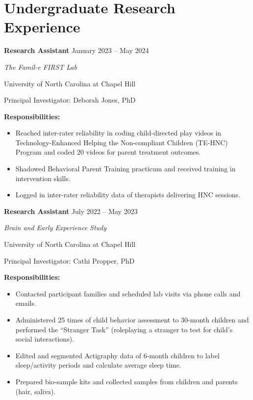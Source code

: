 \documentclass[12pt]{article}
\begin{document}
\section{Undergraduate Research Experience}
\textbf{Research Assistant}
\hfill January 2023 – May 2024

\noindent \textit{The Famil-e FIRST Lab}

\noindent University of North Carolina at Chapel Hill

\noindent Principal Investigator: Deborah Jones, PhD

\vspace{0.5em} \hspace{1em}
\textbf{Responsibilities:}
\begin{itemize} [left=3em]
    \itemsep=-0.35em
    \item Reached inter-rater reliability in coding child-directed play videos in Technology-Enhanced Helping the Non-compliant Children (TE-HNC) Program and coded 20 videos for parent treatment outcomes.
    \item Shadowed Behavioral Parent Training practicum and received training in intervention skills.
    \item Logged in inter-rater reliability data of therapists delivering HNC sessions.
\end{itemize}

\vspace{1em}
\noindent \textbf{Research Assistant}
\hfill July 2022 – May 2023

\noindent \textit{Brain and Early Experience Study}

\noindent University of North Carolina at Chapel Hill

\noindent Principal Investigator: Cathi Propper, PhD

\vspace{1em} \hspace{1em}
\textbf{Responsibilities:}
\begin{itemize} [left=3em]
    \itemsep=-0.35em
    \item Contacted participant families and scheduled lab visits via phone calls and emails.
    \item Administered 25 times of child behavior assessment to 30-month children and performed the “Stranger Task” (roleplaying a stranger to test for child’s social interactions).
    \item Edited and segmented Actigraphy data of 6-month children to label sleep/activity periods and calculate average sleep time.
    \item Prepared bio-sample kits and collected samples from children and parents (hair, saliva).
\end{itemize}
\end{document}
